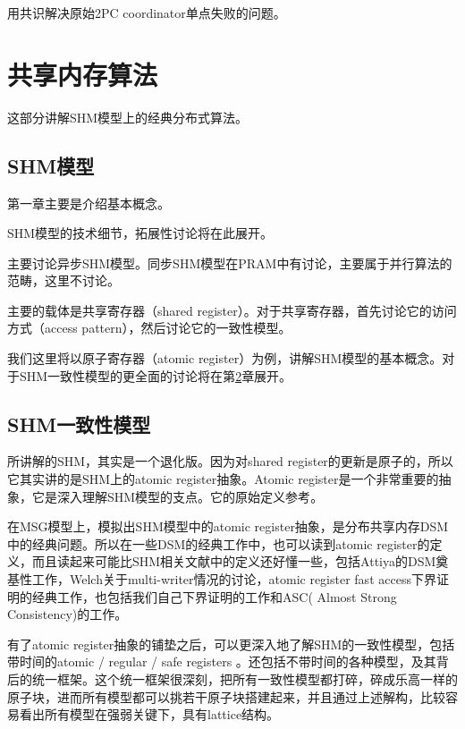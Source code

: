 \documentclass[UTF8]{ctexrep}
\begin{document}
用共识解决原始2PC coordinator单点失败的问题。

\part{共享内存算法}

这部分讲解SHM模型上的经典分布式算法。

\chapter{SHM模型} \label{Chap_SHM}

第一章主要是介绍基本概念。

SHM模型的技术细节，拓展性讨论将在此展开。

主要讨论异步SHM模型。同步SHM模型在PRAM中有讨论，主要属于并行算法的范畴，这里不讨论。

主要的载体是共享寄存器（shared register）。对于共享寄存器，首先讨论它的访问方式（access pattern），然后讨论它的一致性模型。

我们这里将以原子寄存器（atomic register）为例，讲解SHM模型的基本概念。对于SHM一致性模型的更全面的讨论将在第\ref{Chap_SHM-Consis}章展开。


\chapter{SHM一致性模型} \label{Chap_SHM-Consis}

\cite[Chap 4]{Attiya04}所讲解的SHM，其实是一个退化版。因为对shared register的更新是原子的，所以它其实讲的是SHM上的atomic register抽象。Atomic register是一个非常重要的抽象，它是深入理解SHM模型的支点。它的原始定义参考\cite{Lamport86a, Lamport86b}。

在MSG模型上，模拟出SHM模型中的atomic register抽象，是分布共享内存DSM中的经典问题。所以在一些DSM的经典工作中，也可以读到atomic register的定义，而且读起来可能比SHM相关文献中的定义还好懂一些，包括Attiya的DSM奠基性工作\cite{Attiya95}，Welch关于multi-writer情况的讨论\cite{Shao11}，atomic register fast access下界证明的经典工作\cite{Dutta10}，也包括我们自己下界证明的工作\cite{Huang20}和ASC( Almost Strong Consistency)的工作\cite{Wei17, Ouyang21}。

有了atomic register抽象的铺垫之后，可以更深入地了解SHM的一致性模型，包括带时间的atomic / regular / safe registers \cite{Lamport86a, Lamport86b, Shao11}。还包括不带时间的各种模型，及其背后的统一框架\cite{Steinke04}。这个统一框架很深刻，把所有一致性模型都打碎，碎成乐高一样的原子块，进而所有模型都可以挑若干原子块搭建起来，并且通过上述解构，比较容易看出所有模型在强弱关键下，具有lattice结构。
\end{document}
